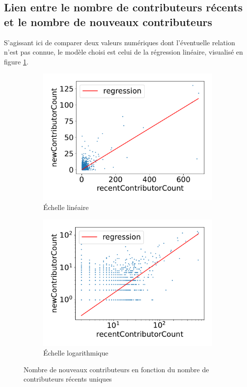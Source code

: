 \documentclass[dvipsnames,runningheads]{llncs}
\begin{document}
    \subsection{Lien entre le nombre de contributeurs récents et le nombre de nouveaux contributeurs}

    S'agissant ici de comparer deux valeurs numériques dont l'éventuelle relation n'est pas connue, le modèle
    choisi est celui de la régression linéaire, visualisé en figure \ref{fig:contributorCount}.

    \begin{figure}
        \centering
        \begin{subfigure}[t]{0.5\textwidth}
            \includegraphics[width=\textwidth]{../experiment/data_analysis/recentContributorCountRegression_linearScale}
            \caption{Échelle linéaire}
        \end{subfigure}%
        \begin{subfigure}[t]{0.5\textwidth}
            \includegraphics[width=\textwidth]{../experiment/data_analysis/recentContributorCountRegression_logScale}
            \caption{Échelle logarithmique}
        \end{subfigure}

        \caption{Nombre de nouveaux contributeurs en fonction du nombre de contributeurs récents uniques}
        \label{fig:contributorCount}
    \end{figure}
\end{document}
